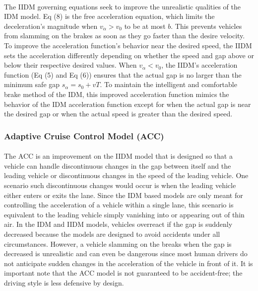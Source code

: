 \documentclass[12pt]{article}
\begin{document}
\paragraph{}
The IIDM governing equations seek to improve the unrealistic qualities of the IDM model. Eq (8) is the free acceleration equation, which limits the deceleration's magnitude when $v_\alpha>v_0$ to be at most $b$. This prevents vehicles from slamming on the brakes as soon as they go faster than the desire velocity.  To improve the acceleration function's behavior near the desired speed, the IIDM sets the acceleration differently depending on whether the speed and gap above or below their respective desired values.  When $v_\alpha < v_0$, the IIDM's acceleration function (Eq (5) and Eq (6)) ensures that the actual gap is no larger than the minimum safe gap $s_\alpha = s_0+vT$.  To maintain the intelligent and comfortable brake method of the IDM, this improved acceleration function mimics the behavior of the IDM acceleration function except for when the actual gap is near the desired gap or when the actual speed is greater than the desired speed.
\subsubsection{Adaptive Cruise Control Model (ACC)}
\paragraph{}
The ACC is an improvement on the IIDM model that is designed so that a vehicle can handle discontinuous changes in the gap between itself and the leading vehicle or discontinuous changes in the speed of the leading vehicle.  One scenario such discontinuous changes would occur is when the leading vehicle either enters or exits the lane.  Since the IDM based models are only meant for controlling the acceleration of a vehicle within a single lane, this scenario is equivalent to the leading vehicle simply vanishing into or appearing out of thin air.  In the IDM and IIDM models, vehicles overreact if the gap is suddenly decreased because the models are designed to avoid accidents under all circumstances.  However, a vehicle slamming on the breaks when the gap is decreased is unrealistic and can even be dangerous since most human drivers do not anticipate sudden changes in the acceleration of the vehicle in front of it.  It is important note that the ACC model is not guaranteed to be accident-free; the driving style is less defensive by design.
\end{document}
